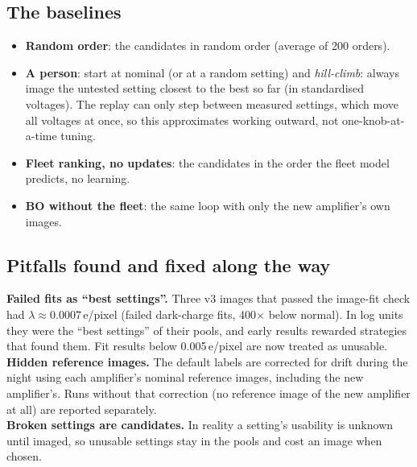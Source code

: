 \documentclass[11pt]{article}
\newcommand{\key}[2][boxbg]{\par\medskip\noindent\colorbox{#1}{\parbox{\dimexpr\linewidth-2\fboxsep}{#2}}\par\medskip}
\begin{document}
\subsection{The baselines}
\begin{itemize}
\item \textbf{Random order}: the candidates in random order (average of 200 orders).
\item \textbf{A person}: start at nominal (or at a random setting) and \emph{hill-climb}: always image the untested setting
  closest to the best so far (in standardised voltages). The replay can only step between measured settings, which move
  all voltages at once, so this approximates working outward, not one-knob-at-a-time tuning.
\item \textbf{Fleet ranking, no updates}: the candidates in the order the fleet model predicts, no learning.
\item \textbf{BO without the fleet}: the same loop with only the new amplifier's own images.
\end{itemize}

\subsection{Pitfalls found and fixed along the way}
\key[warnbg]{\textbf{Failed fits as ``best settings''.} Three v3 images that passed the image-fit check had
$\lambda\approx0.0007$\,e/pixel (failed dark-charge fits, 400$\times$ below normal). In log units they were the ``best
settings'' of their pools, and early results rewarded strategies that found them. Fit results below 0.005\,e/pixel are now
treated as unusable.\\[3pt]
\textbf{Hidden reference images.} The default labels are corrected for drift during the night using each amplifier's
nominal reference images, including the new amplifier's. Runs without that correction (no reference image of the new
amplifier at all) are reported separately.\\[3pt]
\textbf{Broken settings are candidates.} In reality a setting's usability is unknown until imaged, so unusable settings
stay in the pools and cost an image when chosen.}

\end{document}
